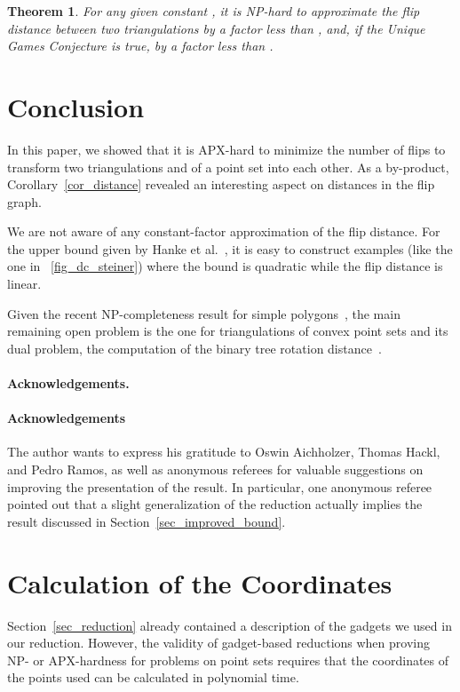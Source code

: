 \documentclass[11pt,a4paper]{article}
\newtheorem{theorem}{Theorem}
\begin{document}
\begin{theorem}
For any given constant , it is NP-hard to approximate the flip distance between two triangulations by a factor less than , and, if the Unique Games Conjecture is true, by a factor less than .
\end{theorem}

\section{Conclusion}
In this paper, we showed that it is APX-hard to minimize the number of flips to transform two triangulations  and  of a point set  into each other.
As a by-product, Corollary~\ref{cor_distance} revealed an interesting aspect on distances in the flip graph.

We are not aware of any constant-factor approximation of the flip distance.
For the upper bound given by Hanke et al.~\cite{edge_flipping_distance}, it is easy to construct examples (like the one in \figurename~\ref{fig_dc_steiner}) where the bound is quadratic while the flip distance is linear.

Given the recent NP-completeness result for simple polygons~\cite{poly_hard}, the main remaining open problem is the one for triangulations of convex point sets and its dual problem, the computation of the binary tree rotation distance~\cite{sleator}.





\ifarxiv
\paragraph{Acknowledgements.}
\else
\paragraph{Acknowledgements}
\fi
The author wants to express his gratitude to Oswin Aichholzer, Thomas Hackl, and Pedro Ramos, as well as anonymous referees for valuable suggestions on improving the presentation of the result.
In particular, one anonymous referee pointed out that a slight generalization of the reduction actually implies the result discussed in Section~\ref{sec_improved_bound}.
\appendix

\newcommand{\Q}{\ensuremath{\mathbb{Q}}}

\section{Calculation of the Coordinates}\label{apx_coordinates}
Section~\ref{sec_reduction} already contained a description of the gadgets we used in our reduction.
However, the validity of gadget-based reductions when proving NP- or APX-hardness for problems on point sets requires that the coordinates of the points used can be calculated in polynomial time.
\end{document}

